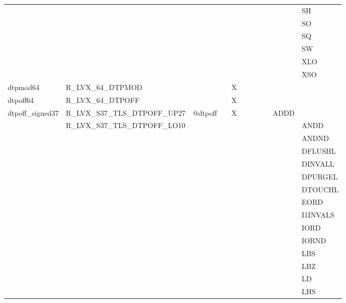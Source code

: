 {\begin{tabular}{|l|l|l|l|l|l|l|l|l|l|l|}
 & & & & & & & & & & \textsf{SH} \\
 & & & & & & & & & & \textsf{SO} \\
 & & & & & & & & & & \textsf{SQ} \\
 & & & & & & & & & & \textsf{SW} \\
 & & & & & & & & & & \textsf{XLO} \\
 & & & & & & & & & & \textsf{XSO} \\
\hline
\textsf{dtpmod64} & \textsf{R\_LVX\_64\_DTPMOD} & \textsf{} & \textsf{} & \textsf{X} & \textsf{} & \textsf{} & \textsf{} & \textsf{} & \textsf{} \\
\hline
\textsf{dtpoff64} & \textsf{R\_LVX\_64\_DTPOFF} & \textsf{} & \textsf{} & \textsf{X} & \textsf{} & \textsf{} & \textsf{} & \textsf{} & \textsf{} \\
\hline
\textsf{dtpoff\_signed37} & \textsf{R\_LVX\_S37\_TLS\_DTPOFF\_UP27} & \textsf{@dtpoff} & \textsf{} & \textsf{X} & \textsf{} & \textsf{} & \textsf{} & \textsf{} & \textsf{ADDD} \\
 & \textsf{R\_LVX\_S37\_TLS\_DTPOFF\_LO10} & & & & & & & & & \textsf{ANDD} \\
 & & & & & & & & & & \textsf{ANDND} \\
 & & & & & & & & & & \textsf{DFLUSHL} \\
 & & & & & & & & & & \textsf{DINVALL} \\
 & & & & & & & & & & \textsf{DPURGEL} \\
 & & & & & & & & & & \textsf{DTOUCHL} \\
 & & & & & & & & & & \textsf{EORD} \\
 & & & & & & & & & & \textsf{I1INVALS} \\
 & & & & & & & & & & \textsf{IORD} \\
 & & & & & & & & & & \textsf{IORND} \\
 & & & & & & & & & & \textsf{LBS} \\
 & & & & & & & & & & \textsf{LBZ} \\
 & & & & & & & & & & \textsf{LD} \\
 & & & & & & & & & & \textsf{LHS} \\
\hline\end{tabular}
}
\smallskip

